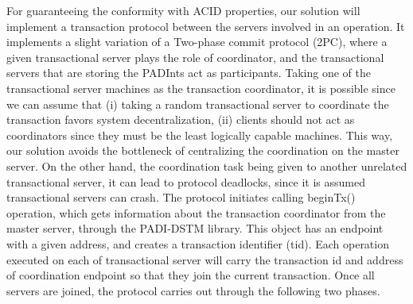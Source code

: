 \documentclass[times, 10pt,twocolumn]{article}
\begin{document}
For guaranteeing the conformity with ACID properties, our solution will implement a transaction protocol between the servers involved in an operation. It implements a slight variation of a Two-phase commit protocol (2PC), where a given transactional server plays the role of coordinator, and the transactional servers that are storing the PADInts act as participants. Taking one of the transactional server machines as the transaction coordinator, it is possible since we can assume that (i) taking a random transactional server to coordinate the transaction favors system decentralization, (ii) clients should not act as coordinators since they must be the least logically capable machines. This way, our solution avoids the bottleneck of centralizing the coordination on the master server. On the other hand, the coordination task being given to another unrelated transactional server, it can lead to protocol deadlocks, since it is assumed transactional servers can crash.
The protocol initiates calling beginTx() operation, which gets information about the transaction coordinator from the master server, through the PADI-DSTM library. This object has an endpoint with a given address, and creates a transaction identifier (tid). Each operation executed on each of transactional server will carry the transaction id and address of coordination endpoint so that they join the current transaction. Once all servers are joined, the protocol carries out through the following two phases.
\end{document}
